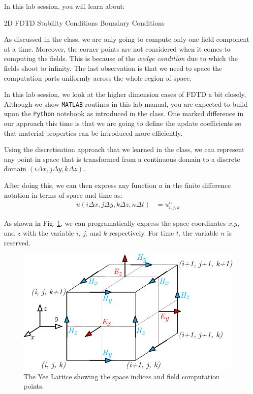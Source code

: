 \documentclass[11pt]{article}
\begin{document}
In this lab session, you will learn about:
\begin{outline}
  \1 2D FDTD
  \1 Stability Conditions
  \1 Boundary Conditions
\end{outline}

As discussed in the class, we are only going to compute only one field component at a time. Moreover, the corner points are not considered when it comes to computing the fields. This is because of the \textit{wedge condition} due to which the fields shoot to infinity. The last observation is that we need to space the computation parts uniformly across the whole region of space.

In this lab session, we look at the higher dimension cases of FDTD a bit closely. Although we show \texttt{MATLAB} routines in this lab manual, you are expected to build upon the \texttt{Python} notebook as introduced in the class. One marked difference in our approach this time is that we are going to define the update coefficients so that material properties can be introduced more efficiently.

Using the discretisation approach that we learned in the class, we can represent any point in space that is transformed from a continuous domain to a discrete domain $(i\Delta x,j\Delta y,k \Delta z)$.

After doing this, we can then express any function $u$ in the finite difference notation in terms of space and time as:
\begin{align}
  u(i\Delta x,j\Delta y,k \Delta z, n \Delta t) & = u_{i,j,k}^n
\end{align}

As shown in Fig. \ref{fig:yee_lattice}, we can programatically express the space coordinates $x$,$y$, and $z$ with the variable $i$, $j$, and $k$ respectively. For time $t$, the variable $n$ is reserved.

\begin{figure}[h!]
  \centering
  \includegraphics[width=.5\textwidth]{yee lattice.pdf}
  \caption{The Yee Lattice showing the space indices and field computation points.}
  \label{fig:yee_lattice}
\end{figure}
\end{document}
